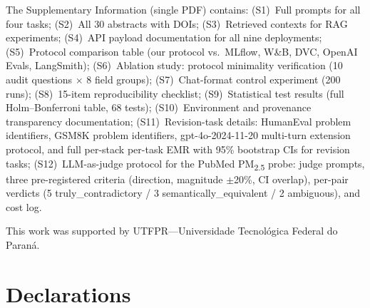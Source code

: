 \documentclass[sn-nature]{sn-jnl}
\begin{document}

The Supplementary Information (single PDF) contains:
(S1)~Full prompts for all four tasks;
(S2)~All 30 abstracts with DOIs;
(S3)~Retrieved contexts for RAG experiments;
(S4)~API payload documentation for all nine deployments;
(S5)~Protocol comparison table (our protocol vs.\ MLflow, W\&B, DVC, OpenAI Evals, LangSmith);
(S6)~Ablation study: protocol minimality verification (10 audit questions $\times$ 8 field groups);
(S7)~Chat-format control experiment (200 runs);
(S8)~15-item reproducibility checklist;
(S9)~Statistical test results (full Holm--Bonferroni table, 68 tests);
(S10)~Environment and provenance transparency documentation;
(S11)~Revision-task details: HumanEval problem identifiers, GSM8K problem identifiers, gpt-4o-2024-11-20 multi-turn extension protocol, and full per-stack per-task EMR with 95\% bootstrap CIs for revision tasks;
(S12)~LLM-as-judge protocol for the PubMed PM\textsubscript{2.5} probe: judge prompts, three pre-registered criteria (direction, magnitude $\pm$20\%, CI overlap), per-pair verdicts (5 truly\_contradictory / 3 semantically\_equivalent / 2 ambiguous), and cost log.


This work was supported by UTFPR---Universidade Tecnol\'ogica Federal do Paran\'a.

\section*{Declarations}
\end{document}
